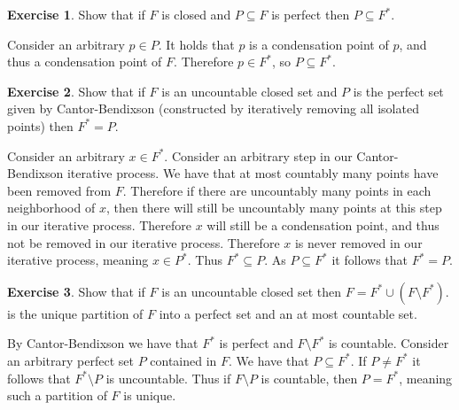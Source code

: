 \documentclass{article}
\theoremstyle{definition}
\newtheorem{exer}{Exercise}[section]
\newlength{\defparindent}
\newenvironment{answer}
    {\begin{mdframed}[backgroundcolor=gray!15, linewidth=0pt] \setlength{\parindent}{\defparindent}}
    {\end{mdframed}}
\begin{document}
\begin{exer}
    Show that if $F$ is closed and $P \subseteq F$ is perfect then $P \subseteq F^*$.
    \begin{answer}
        Consider an arbitrary $p \in P$. It holds that $p$ is a condensation point of $p$, and thus a condensation point of $F$. Therefore $p \in F^*$, so $P \subseteq F^*$.
    \end{answer}
\end{exer}

\begin{exer}
    Show that if $F$ is an uncountable closed set and $P$ is the perfect set given by Cantor-Bendixson (constructed by iteratively removing all isolated points) then $F^* = P$.
    \begin{answer}
        Consider an arbitrary $x \in F^*$. Consider an arbitrary step in our Cantor-Bendixson iterative process. We have that at most countably many points have been removed from $F$. Therefore if there are uncountably many points in each neighborhood of $x$, then there will still be uncountably many points at this step in our iterative process. Therefore $x$ will still be a condensation point, and thus not be removed in our iterative process. Therefore $x$ is never removed in our iterative process, meaning $x \in P^*$. Thus $F^* \subseteq P$. As $P \subseteq F^*$ it follows that $F^* = P$.
    \end{answer}
\end{exer}

\newpage

\begin{exer}
    Show that if $F$ is an uncountable closed set then $F = F^* \cup (F \setminus F^*)$. is the unique partition of $F$ into a perfect set and an at most countable set.
    \begin{answer}
        By Cantor-Bendixson we have that $F^*$ is perfect and $F \setminus F^*$ is countable. Consider an arbitrary perfect set $P$ contained in $F$. We have that $P \subseteq F^*$. If $P \neq F^*$ it follows that $F^* \setminus P$ is uncountable. Thus if $F \setminus P$ is countable, then $P = F^*$, meaning such a partition of $F$ is unique.
    \end{answer}
\end{exer}
\end{document}
